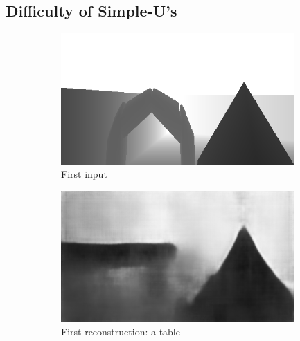 \subsection{Difficulty of Simple-U's}
\begin{figure}[H]
    \centering
    \begin{subfigure}[b]{0.49\textwidth}
        \centering
        \captionsetup{justification=centering}
        \includegraphics[width=0.98\textwidth]{figures/9_/58_0_a_pre_image.png}
        \caption{First input}
        \label{fig:58_0_a_pre_image}
    \end{subfigure} 
    \hfill
    \begin{subfigure}[b]{0.49\textwidth}
        \centering
        \captionsetup{justification=centering}
        \includegraphics[width=0.98\textwidth]{figures/9_/58_0_c_vae_image.png}
        \caption{First reconstruction: a table}
        \label{fig:58_0_c_vae_image}
    \end{subfigure}
    \\
    \begin{subfigure}[b]{0.49\textwidth}
        \centering
        \captionsetup{justification=centering}

\end{subfigure}
\end{figure}
